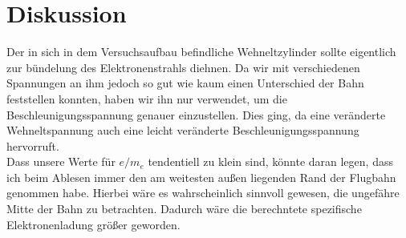 \documentclass[12pt,a4paper,titlepage,headinclude,bibtotoc]{scrartcl}
\numberwithin{equation}{section}
\begin{document}
\section{Diskussion}
\label{sec:diskussion}
Der in sich in dem Versuchsaufbau befindliche Wehneltzylinder sollte eigentlich zur bündelung des Elektronenstrahls diehnen.
Da wir mit verschiedenen Spannungen an ihm jedoch so gut wie kaum einen Unterschied der Bahn feststellen konnten, haben wir ihn nur verwendet, um die Beschleunigungsspannung genauer einzustellen.
Dies ging, da eine veränderte Wehneltspannung auch eine leicht veränderte Beschleunigungsspannung hervorruft.\\
Dass unsere Werte für $e/m_e$ tendentiell zu klein sind, könnte daran legen, dass ich beim Ablesen immer den am weitesten außen liegenden Rand der Flugbahn genommen habe.
Hierbei wäre es wahrscheinlich sinnvoll gewesen, die ungefähre Mitte der Bahn zu betrachten.
Dadurch wäre die berechntete spezifische Elektronenladung größer geworden.




\end{document}
